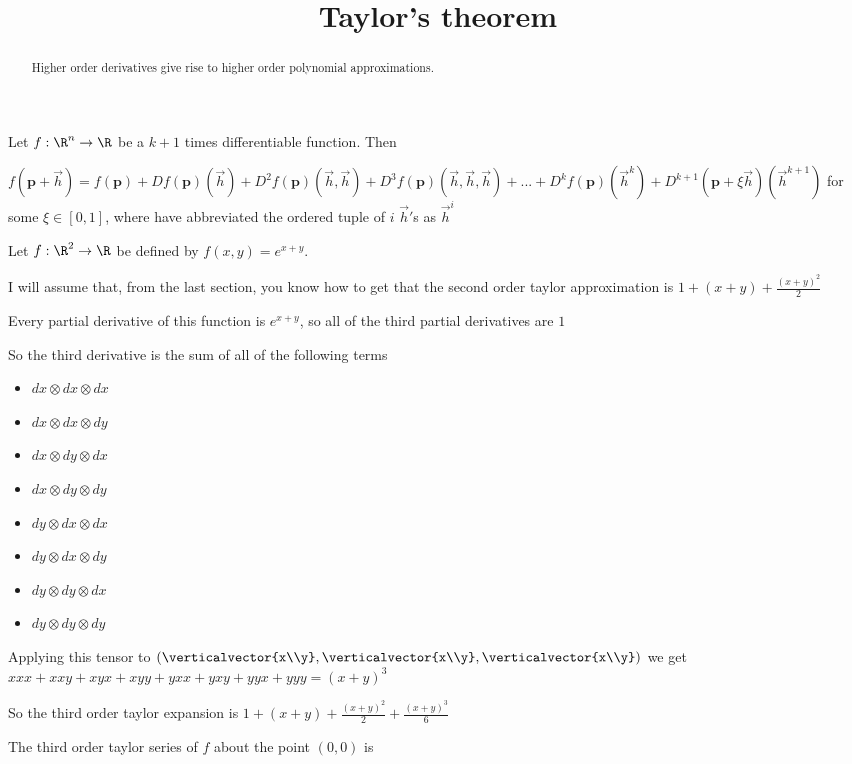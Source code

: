 \documentclass{ximera}
\title{Taylor's theorem}
\begin{document}
\begin{abstract}
	Higher order derivatives give rise to higher order polynomial approximations.
\end{abstract}

\begin{theorem}
	Let $f:\R^n \to \R$ be a $k+1$ times differentiable function.  Then
	
	$f(\mathbf{p}+\vec{h}) 
	= f(\mathbf{p})+Df(\mathbf{p})(\vec{h})+D^2f(\mathbf{p})(\vec{h},\vec{h})+D^3f(\mathbf{p})(\vec{h},\vec{h},\vec{h})+...
	+D^kf(\mathbf{p})(\vec{h}^k) + D^{k+1}(\mathbf{p}+\xi\vec{h})(\vec{h}^{k+1})$ for some $\xi \in [0,1]$,  where have abbreviated the 
	ordered tuple of $i$ $\vec{h}'$s as $\vec{h}^i$
\end{theorem}

	\begin{question}
		Let $f:\R^2 \to \R$ be defined by $f(x,y) = e^{x+y}$.  
		\begin{solution}
			\begin{hint}
				I will assume that, from the last section, you know how to get that the second order taylor approximation is $1+(x+y)+\frac{(x+y)^2}{2}$
			\end{hint}
			\begin{hint}
				Every partial derivative of this function is $e^{x+y}$, so all of the third partial derivatives are $1$
			\end{hint}
			\begin{hint}
				So the third derivative is the sum of all of the following terms 
				\begin{itemize}
					\item $dx \otimes dx \otimes dx$
					\item $dx \otimes dx \otimes dy$
					\item $dx \otimes dy \otimes dx$
					\item $dx \otimes dy \otimes dy$
					\item $dy \otimes dx \otimes dx$
					\item $dy \otimes dx \otimes dy$
					\item $dy \otimes dy \otimes dx$
					\item $dy \otimes dy \otimes dy$
				\end{itemize}
			\end{hint}
			\begin{hint}
				Applying this tensor to $(\verticalvector{x\\y},\verticalvector{x\\y},\verticalvector{x\\y})$ we get 
				$xxx+xxy+xyx+xyy+yxx+yxy+yyx+yyy = (x+y)^3$
			\end{hint}
			\begin{hint}
				So the third order taylor expansion is $1+(x+y)+\frac{(x+y)^2}{2}+\frac{(x+y)^3}{6}$
			\end{hint}
			The third order taylor series of $f$ about the point $(0,0)$ is 
		\end{solution}
	\end{question}
	
	
	
	
\end{document}
